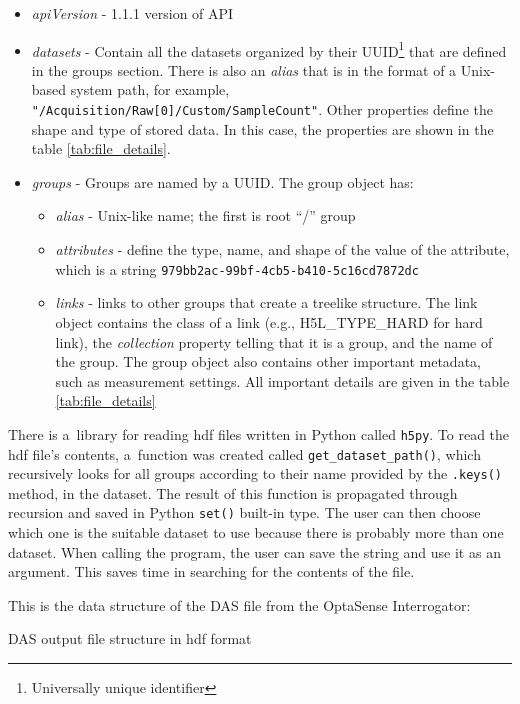 \begin{itemize}
    \item \textit{apiVersion} - 1.1.1 version of API
    \item \textit{datasets} - Contain all the datasets organized by their UUID\footnote{Universally unique identifier} that are defined in the groups section. There is also an \textit{alias} that is in the format of a Unix-based system path, for example, \verb|"/Acquisition/Raw[0]/Custom/SampleCount"|. Other properties define the shape and type of stored data. In this case, the properties are shown in the table \ref{tab:file_details}.
    \item \textit{groups} - Groups are named by a UUID. The group object has:
        \begin{itemize}
            \item \textit{alias} - Unix-like name; the first is root ``/'' group
            \item \textit{attributes} - define the type, name, and shape of the value of the attribute, which is a string \verb|979bb2ac-99bf-4cb5-b410-5c16cd7872dc|
            \item \textit{links} - links to other groups that create a treelike structure. The link object contains the class of a link (e.g., H5L\_TYPE\_HARD for hard link), the \textit{collection} property telling that it is a group, and the name of the group. The group object also contains other important metadata, such as measurement settings. All important details are given in the table \ref{tab:file_details}
        \end{itemize}
\end{itemize}

There is a~library for reading \ac{hdf} files written in Python called \verb|h5py|. To read the \ac{hdf} file's contents, a~function was created called \verb|get_dataset_path()|, which recursively looks for all groups according to their name provided by the \verb|.keys()| method, in the dataset. The result of this function is propagated through recursion and saved in Python \verb|set()| built-in type. The user can then choose which one is the suitable dataset to use because there is probably more than one dataset. When calling the program, the user can save the string and use it as an argument. This saves time in searching for the contents of the file.

This is the data structure of the DAS file from the OptaSense Interrogator:

\bigskip
DAS output file structure in \ac{hdf} format
{\small
%
\label{dir:filestructure}
}
\bigskip

